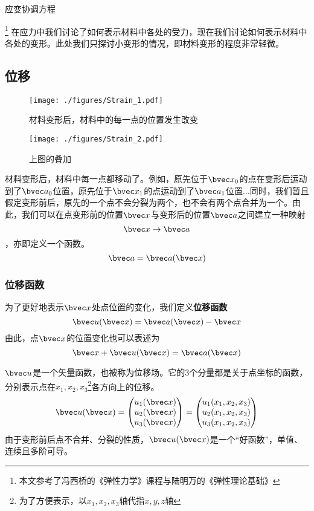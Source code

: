 
\begin{issues}
\issueTODO 
应变协调方程
\end{issues}

\footnote{本文参考了冯西桥的《弹性力学》课程与陆明万的《弹性理论基础》}
在应力中我们讨论了如何表示材料中各处的受力，现在我们讨论如何表示材料中各处的变形。此处我们只探讨小变形的情况，即材料变形的程度非常轻微。
\subsection{位移}
\begin{figure}[ht]
\centering
\texttt{[image: ./figures/Strain\_1.pdf]}
\caption{材料变形后，材料中的每一点的位置发生改变} \label{Strain_fig1}
\end{figure}
\begin{figure}[ht]
\centering
\texttt{[image: ./figures/Strain\_2.pdf]}
\caption{上图的叠加} \label{Strain_fig2}
\end{figure}

材料变形后，材料中每一点都移动了。例如，原先位于$\bvec x_0$的点在变形后运动到了$\bvec a_0$位置，原先位于$\bvec x_1$的点运动到了$\bvec a_1$位置...同时，我们暂且假定变形前后，原先的一个点不会分裂为两个，也不会有两个点合并为一个。由此，我们可以在点变形前的位置$\bvec x$与变形后的位置$\bvec a$之间建立一种映射$$\bvec x\rightarrow \bvec a$$，亦即定义一个函数。$$\bvec a = \bvec a (\bvec x)$$

\subsubsection{位移函数}
为了更好地表示$\bvec x$处点位置的变化，我们定义\textbf{位移函数}
\begin{equation}
\bvec u (\bvec x) =\bvec a (\bvec x) - \bvec x
\end{equation}
由此，点$\bvec x$的位置变化也可以表述为
\begin{equation}
\bvec x + \bvec u (\bvec x) =\bvec a (\bvec x) 
\end{equation}

$\bvec u$是一个矢量函数，也被称为位移场。它的3个分量都是关于点坐标的函数，分别表示点在$x_1, x_2, x_3$\footnote{为了方便表示，以$x_1, x_2, x_3$轴代指$x,y,z$轴}各方向上的位移。
$$\bvec u(\bvec x) = 
\begin{pmatrix}
u_1(\bvec x)\\
u_2(\bvec x)\\
u_3(\bvec x)\\
\end{pmatrix}
=
\begin{pmatrix}
u_1(x_1, x_2, x_3)\\
u_2(x_1, x_2, x_3)\\
u_3(x_1, x_2, x_3)\\
\end{pmatrix}
$$
由于变形前后点不合并、分裂的性质，$\bvec u(\bvec x)$是一个“好函数”，单值、连续且多阶可导。

